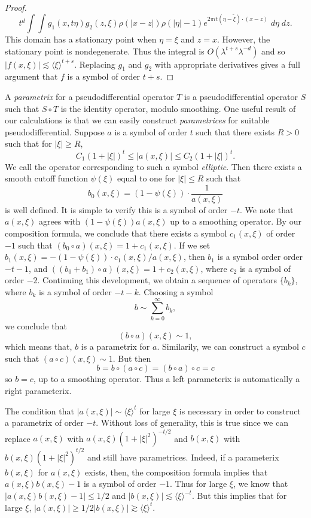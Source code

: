 \begin{proof}
    \[ t^d \int \int g_1(x, t \eta) g_2(z,\xi) \rho(|x - z|) \rho(|\eta| - 1) e^{2 \pi i t (\eta - \tilde{\xi}) \cdot (x - z)}\; d\eta\; dz. \]
    This domain has a stationary point when $\eta = \xi$ and $z = x$. However, the stationary point is nondegenerate. Thus the integral is $O(\lambda^{t + s} \lambda^{-d})$ and so $|f(x,\xi)| \lesssim \langle \xi \rangle^{t + s}$. Replacing $g_1$ and $g_2$ with appropriate derivatives gives a full argument that $f$ is a symbol of order $t + s$.
\end{proof}

A \emph{parametrix} for a pseudodifferential operator $T$ is a pseudodifferential operator $S$ such that $S \circ T$ is the identity operator, modulo smoothing. One useful result of our calculations is that we can easily construct \emph{parametrices} for suitable pseudodifferential. Suppose $a$ is a symbol of order $t$ such that there exists $R > 0$ such that for $|\xi| \geq R$,
%
\[ C_1 (1 + |\xi|)^t \leq |a(x,\xi)| \leq C_2 (1 + |\xi|)^t. \]
%
We call the operator corresponding to such a symbol \emph{elliptic}. Then there exists a smooth cutoff function $\psi(\xi)$ equal to one for $|\xi| \leq R$ such that
%
\[ b_0(x,\xi) = \left( 1 - \psi(\xi) \right) \cdot \frac{1}{a(x,\xi)} \]
%
is well defined. It is simple to verify this is a symbol of order $-t$. We note that $a(x,\xi)$ agrees with $(1 - \psi(\xi)) a(x,\xi)$ up to a smoothing operator. By our composition formula, we conclude that there exists a symbol $c_1(x,\xi)$ of order $-1$ such that $(b_0 \circ a)(x,\xi) = 1 + c_1(x,\xi)$. If we set $b_1(x,\xi) = - (1 - \psi(\xi)) \cdot c_1(x,\xi) / a(x,\xi)$, then $b_1$ is a symbol order order $-t - 1$, and $((b_0 + b_1) \circ a)(x,\xi) = 1 + c_2(x,\xi)$, where $c_2$ is a symbol of order $-2$. Continuing this development, we obtain a sequence of operators $\{ b_k \}$, where $b_k$ is a symbol of order $-t - k$. Choosing a symbol
%
\[ b \sim \sum_{k = 0}^\infty b_k, \]
%
we conclude that
%
\[ (b \circ a)(x,\xi) \sim 1, \]
%
which means that, $b$ is a parametrix for $a$. Similarily, we can construct a symbol $c$ such that $(a \circ c)(x,\xi) \sim 1$. But then
%
\[ b = b \circ (a \circ c) = (b \circ a) \circ c = c \]
%
so $b = c$, up to a smoothing operator. Thus a left parameterix is automatically a right parameterix.

\begin{remark}
    The condition that $|a(x,\xi)| \sim \langle \xi \rangle^t$ for large $\xi$ is necessary in order to construct a parametrix of order $-t$. Without loss of generality, this is true since we can replace $a(x,\xi)$ with $a(x,\xi) (1 + |\xi|^2)^{-t/2}$ and $b(x,\xi)$ with $b(x,\xi) (1 + |\xi|^2)^{t/2}$ and still have parametrices. Indeed, if a parameterix $b(x,\xi)$ for $a(x,\xi)$ exists, then, the composition formula implies that $a(x,\xi) b(x,\xi) - 1$ is a symbol of order $-1$. Thus for large $\xi$, we know that $|a(x,\xi) b(x,\xi) - 1| \leq 1/2$ and $|b(x,\xi)| \lesssim \langle \xi \rangle^{-t}$. But this implies that for large $\xi$, $|a(x,\xi)| \geq 1/2 |b(x,\xi)| \gtrsim \langle \xi \rangle^t$.
\end{remark}

